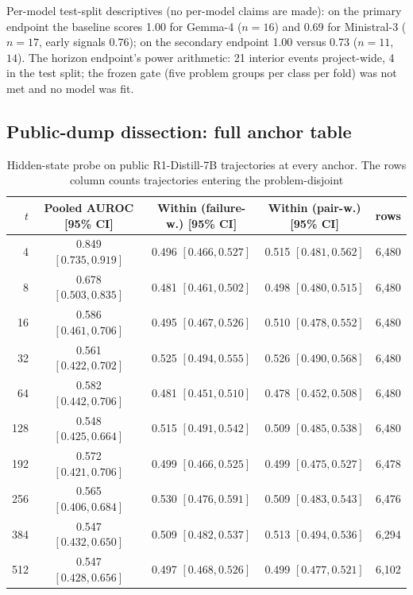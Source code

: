 Per-model test-split descriptives (no per-model claims are made): on the
primary endpoint the baseline scores 1.00 for Gemma-4 ($n{=}16$) and 0.69
for Ministral-3 ($n{=}17$, early signals 0.76); on the secondary endpoint
1.00 versus 0.73 ($n{=}11$, $14$). The horizon endpoint's power
arithmetic: 21 interior events project-wide, 4 in the test split; the
frozen gate (five problem groups per class per fold) was not met and no
model was fit.

\subsection{Public-dump dissection: full anchor table}

\begin{table}[htbp]\centering\small
\begin{tabular}{rcccc}
\toprule
$t$ & Pooled AUROC [95\% CI] & Within (failure-w.) [95\% CI] & Within (pair-w.) [95\% CI] & rows \\
\midrule
4   & 0.849 $[0.735{,} 0.919]$ & 0.496 $[0.466{,} 0.527]$ & 0.515 $[0.481{,} 0.562]$ & 6{,}480 \\
8   & 0.678 $[0.503{,} 0.835]$ & 0.481 $[0.461{,} 0.502]$ & 0.498 $[0.480{,} 0.515]$ & 6{,}480 \\
16   & 0.586 $[0.461{,} 0.706]$ & 0.495 $[0.467{,} 0.526]$ & 0.510 $[0.478{,} 0.552]$ & 6{,}480 \\
32   & 0.561 $[0.422{,} 0.702]$ & 0.525 $[0.494{,} 0.555]$ & 0.526 $[0.490{,} 0.568]$ & 6{,}480 \\
64   & 0.582 $[0.442{,} 0.706]$ & 0.481 $[0.451{,} 0.510]$ & 0.478 $[0.452{,} 0.508]$ & 6{,}480 \\
128   & 0.548 $[0.425{,} 0.664]$ & 0.515 $[0.491{,} 0.542]$ & 0.509 $[0.485{,} 0.538]$ & 6{,}480 \\
192   & 0.572 $[0.421{,} 0.706]$ & 0.499 $[0.466{,} 0.525]$ & 0.499 $[0.475{,} 0.527]$ & 6{,}478 \\
256   & 0.565 $[0.406{,} 0.684]$ & 0.530 $[0.476{,} 0.591]$ & 0.509 $[0.483{,} 0.543]$ & 6{,}476 \\
384   & 0.547 $[0.432{,} 0.650]$ & 0.509 $[0.482{,} 0.537]$ & 0.513 $[0.494{,} 0.536]$ & 6{,}294 \\
512   & 0.547 $[0.428{,} 0.656]$ & 0.497 $[0.468{,} 0.526]$ & 0.499 $[0.477{,} 0.521]$ & 6{,}102 \\
\bottomrule
\end{tabular}
\caption{Hidden-state probe on public R1-Distill-7B trajectories at every
anchor. The rows column counts trajectories entering the problem-disjoint
}
\end{table}
